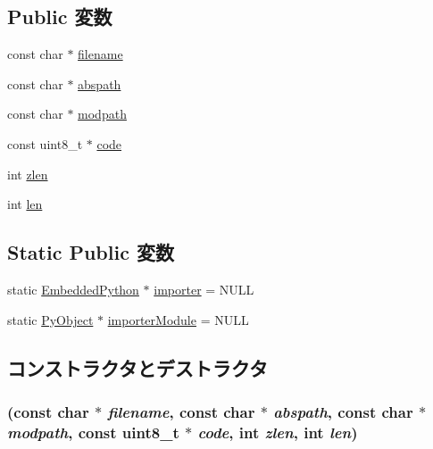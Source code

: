 \subsection*{Public 変数}
\begin{DoxyCompactItemize}
\item 
const char $\ast$ \hyperlink{structEmbeddedPython_a7efa5e9c7494c7d4586359300221aa5d}{filename}
\item 
const char $\ast$ \hyperlink{structEmbeddedPython_a7e37ebe634a47d707d33b62f3afa2e6f}{abspath}
\item 
const char $\ast$ \hyperlink{structEmbeddedPython_adb35c720a17cc1108823c3bf5591d4e1}{modpath}
\item 
const uint8\_\-t $\ast$ \hyperlink{structEmbeddedPython_a5588144d84c4c0c07d52c2f1dfebfa4f}{code}
\item 
int \hyperlink{structEmbeddedPython_a0dbae0464f702cabe3fca2905e9f5558}{zlen}
\item 
int \hyperlink{structEmbeddedPython_afed088663f8704004425cdae2120b9b3}{len}
\end{DoxyCompactItemize}
\subsection*{Static Public 変数}
\begin{DoxyCompactItemize}
\item 
static \hyperlink{structEmbeddedPython}{EmbeddedPython} $\ast$ \hyperlink{structEmbeddedPython_a63b362c63de6abddc6a7748ec11027be}{importer} = NULL
\item 
static \hyperlink{init_8hh_ae19630c1f4ca6d5236b30719d9140013}{PyObject} $\ast$ \hyperlink{structEmbeddedPython_a41075c0fd7283165b45b2d6938d85c2f}{importerModule} = NULL
\end{DoxyCompactItemize}


\subsection{コンストラクタとデストラクタ}
\hypertarget{structEmbeddedPython_a8690d24139e438be597d431ff246f6cc}{
\subsubsection[{EmbeddedPython}]{ (const char $\ast$ {\em filename}, \/  const char $\ast$ {\em abspath}, \/  const char $\ast$ {\em modpath}, \/  const uint8\_\-t $\ast$ {\em code}, \/  int {\em zlen}, \/  int {\em len})}}
\label{structEmbeddedPython_a8690d24139e438be597d431ff246f6cc}


